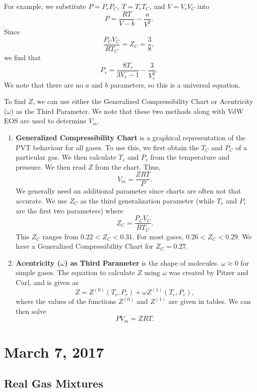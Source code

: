 \documentclass[11pt]{article}
\theoremstyle{plain} %
\theoremstyle{definition}
\theoremstyle{example}
\theoremstyle{remark}
\begin{document}
For example, we substitute $P  = P_rP_C$, $T = T_rT_C$, and $V = V_rV_C$ into $$P = \frac{RT}{V-b}-\frac{a}{V^2}.$$ Since $$\frac{P_CV_C}{RT_C} = Z_C = \frac{3}{8},$$
we find that 
$$P_r = \frac{8T_r}{3V_r-1}-\frac{3}{V_r^2}.$$	
We note that there are no $a$ and $b$ parameters, so this is a universal equation. 

To find $Z$, we can use either the Generalized Compressibility Chart or Acentricity ($\omega$) as the Third Parameter. We note that these two methods along with VdW EOS are used to determine $V_m$. 
\begin{enumerate}
	\item \textbf{Generalized Compressibility Chart} is a graphical representation of the PVT behaviour for all gases. To use this, we first obtain the $T_C$ and $P_C$ of a particular gas. We then calculate $T_r$ and $P_r$ from the temperature and pressure. We then read $Z$ from the chart. Thus,
$$V_m = \frac{ZRT}{P}.$$
We generally need an additional parameter since charts are often not that accurate. We use $Z_C$ as the third generalization parameter (while $T_r$ and $P_r$ are the first two parameters) where 
$$Z_C = \frac{P_CV_C}{RT_C}.$$
This $Z_C$ ranges from $0.22 < Z_C <0.31$. For most gases, $0.26 < Z_C < 0.29$. We have a Generalized Compressibility Chart for $Z_C = 0.27$. 
	\item \textbf{Acentricity ($\omega$) as Third Parameter} is the shape of molecules. $\omega \approx 0$ for simple gases. The equation to calculate $Z$ using $\omega$ was created by Pitzer and Curl, and is given as 
	$$Z = Z^{(0)}(T_r,P_r)+\omega Z^{(1)}(T_r,P_r),$$
	where the values of the functions $Z^{(0)}$ and $Z^{(1)}$ are given in tables. We can then solve 
	$$PV_m = ZRT.$$
\end{enumerate}
	

\section{March 7, 2017}
\subsection{Real Gas Mixtures}
\end{document}
